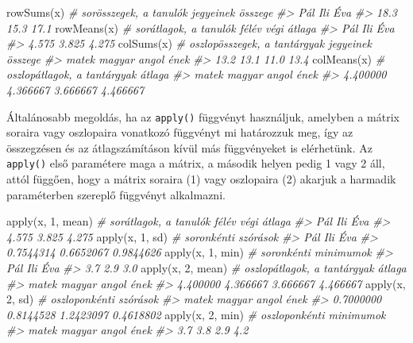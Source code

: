 \documentclass[
]{book}
\newenvironment{Shaded}{\begin{snugshade}}{\end{snugshade}}
\newcommand{\CommentTok}[1]{\textcolor[rgb]{0.56,0.35,0.01}{\textit{#1}}}
\newcommand{\DecValTok}[1]{\textcolor[rgb]{0.00,0.00,0.81}{#1}}
\newcommand{\FunctionTok}[1]{\textcolor[rgb]{0.00,0.00,0.00}{#1}}
\newcommand{\NormalTok}[1]{#1}
\begin{document}
\begin{Shaded}
\begin{Highlighting}[]
\FunctionTok{rowSums}\NormalTok{(x)      }\CommentTok{\# sorösszegek, a tanulók jegyeinek összege}
\CommentTok{\#\textgreater{}  Pál  Ili  Éva }
\CommentTok{\#\textgreater{} 18.3 15.3 17.1}
\FunctionTok{rowMeans}\NormalTok{(x)     }\CommentTok{\# sorátlagok, a tanulók félév végi átlaga}
\CommentTok{\#\textgreater{}   Pál   Ili   Éva }
\CommentTok{\#\textgreater{} 4.575 3.825 4.275}
\FunctionTok{colSums}\NormalTok{(x)      }\CommentTok{\# oszlopösszegek, a tantárgyak jegyeinek összege}
\CommentTok{\#\textgreater{}  matek magyar  angol   ének }
\CommentTok{\#\textgreater{}   13.2   13.1   11.0   13.4}
\FunctionTok{colMeans}\NormalTok{(x)     }\CommentTok{\# oszlopátlagok, a tantárgyak átlaga}
\CommentTok{\#\textgreater{}    matek   magyar    angol     ének }
\CommentTok{\#\textgreater{} 4.400000 4.366667 3.666667 4.466667}
\end{Highlighting}
\end{Shaded}

Általánosabb megoldás, ha az \texttt{apply()} függvényt használjuk, amelyben a mátrix soraira vagy oszlopaira vonatkozó függvényt mi határozzuk meg, így az összegzésen és az átlagszámításon kívül más függvényeket is elérhetünk. Az \texttt{apply()} első paramétere maga a mátrix, a második helyen pedig 1 vagy 2 áll, attól függően, hogy a mátrix soraira (1) vagy oszlopaira (2) akarjuk a harmadik paraméterben szereplő függvényt alkalmazni.

\begin{Shaded}
\begin{Highlighting}[]
\FunctionTok{apply}\NormalTok{(x, }\DecValTok{1}\NormalTok{, mean)    }\CommentTok{\# sorátlagok, a tanulók félév végi átlaga}
\CommentTok{\#\textgreater{}   Pál   Ili   Éva }
\CommentTok{\#\textgreater{} 4.575 3.825 4.275}
\FunctionTok{apply}\NormalTok{(x, }\DecValTok{1}\NormalTok{, sd)      }\CommentTok{\# soronkénti szórások}
\CommentTok{\#\textgreater{}       Pál       Ili       Éva }
\CommentTok{\#\textgreater{} 0.7544314 0.6652067 0.9844626}
\FunctionTok{apply}\NormalTok{(x, }\DecValTok{1}\NormalTok{, min)     }\CommentTok{\# soronkénti minimumok}
\CommentTok{\#\textgreater{} Pál Ili Éva }
\CommentTok{\#\textgreater{} 3.7 2.9 3.0}
\FunctionTok{apply}\NormalTok{(x, }\DecValTok{2}\NormalTok{, mean)    }\CommentTok{\# oszlopátlagok, a tantárgyak átlaga}
\CommentTok{\#\textgreater{}    matek   magyar    angol     ének }
\CommentTok{\#\textgreater{} 4.400000 4.366667 3.666667 4.466667}
\FunctionTok{apply}\NormalTok{(x, }\DecValTok{2}\NormalTok{, sd)      }\CommentTok{\# oszloponkénti szórások}
\CommentTok{\#\textgreater{}     matek    magyar     angol      ének }
\CommentTok{\#\textgreater{} 0.7000000 0.8144528 1.2423097 0.4618802}
\FunctionTok{apply}\NormalTok{(x, }\DecValTok{2}\NormalTok{, min)     }\CommentTok{\# oszloponkénti minimumok}
\CommentTok{\#\textgreater{}  matek magyar  angol   ének }
\CommentTok{\#\textgreater{}    3.7    3.8    2.9    4.2}
\end{Highlighting}
\end{Shaded}
\end{document}
